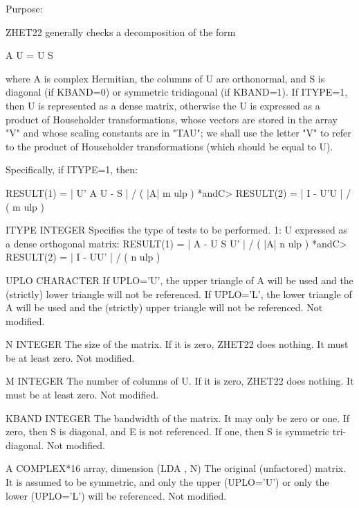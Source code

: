 \begin{DoxyParagraph}{Purpose\+: }
\begin{DoxyVerb}      ZHET22  generally checks a decomposition of the form

              A U = U S

      where A is complex Hermitian, the columns of U are orthonormal,
      and S is diagonal (if KBAND=0) or symmetric tridiagonal (if
      KBAND=1).  If ITYPE=1, then U is represented as a dense matrix,
      otherwise the U is expressed as a product of Householder
      transformations, whose vectors are stored in the array "V" and
      whose scaling constants are in "TAU"; we shall use the letter
      "V" to refer to the product of Householder transformations
      (which should be equal to U).

      Specifically, if ITYPE=1, then:

              RESULT(1) = | U' A U - S | / ( |A| m ulp ) *andC>              RESULT(2) = | I - U'U | / ( m ulp )\end{DoxyVerb}
 \begin{DoxyVerb}  ITYPE   INTEGER
          Specifies the type of tests to be performed.
          1: U expressed as a dense orthogonal matrix:
             RESULT(1) = | A - U S U' | / ( |A| n ulp )   *andC>             RESULT(2) = | I - UU' | / ( n ulp )

  UPLO    CHARACTER
          If UPLO='U', the upper triangle of A will be used and the
          (strictly) lower triangle will not be referenced.  If
          UPLO='L', the lower triangle of A will be used and the
          (strictly) upper triangle will not be referenced.
          Not modified.

  N       INTEGER
          The size of the matrix.  If it is zero, ZHET22 does nothing.
          It must be at least zero.
          Not modified.

  M       INTEGER
          The number of columns of U.  If it is zero, ZHET22 does
          nothing.  It must be at least zero.
          Not modified.

  KBAND   INTEGER
          The bandwidth of the matrix.  It may only be zero or one.
          If zero, then S is diagonal, and E is not referenced.  If
          one, then S is symmetric tri-diagonal.
          Not modified.

  A       COMPLEX*16 array, dimension (LDA , N)
          The original (unfactored) matrix.  It is assumed to be
          symmetric, and only the upper (UPLO='U') or only the lower
          (UPLO='L') will be referenced.
          Not modified.


\end{DoxyVerb}
\end{DoxyParagraph}
